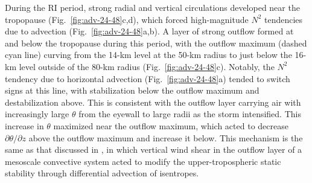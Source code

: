 \documentclass{ametsoc}
\begin{document}
During the RI period, strong radial and vertical circulations developed near the tropopause (Fig.~\ref{fig:adv-24-48}c,d), which forced high-magnitude $N^2$ tendencies due to advection (Fig.~\ref{fig:adv-24-48}a,b).
A layer of strong outflow formed at and below the tropopause during this period, with the outflow maximum (dashed cyan line) curving from the 14-km level at the 50-km radius to just below the 16-km level outside of the 80-km radius (Fig.~\ref{fig:adv-24-48}c).
Notably, the $N^2$ tendency due to horizontal advection (Fig.~\ref{fig:adv-24-48}a) tended to switch signs at this line, with stabilization below the outflow maximum and destabilization above.
This is consistent with the outflow layer carrying air with increasingly large $\theta$ from the eyewall to large radii as the storm intensified.
This increase in $\theta$ maximized near the outflow maximum, which acted to decrease $\partial \theta/\partial z$ above the outflow maximum and increase it below.
This mechanism is the same as that discussed in \cite{TrierSharman}, in which vertical wind shear in the outflow layer of a mesoscale convective system acted to modify the upper-tropospheric static stability through differential advection of isentropes.
\end{document}
